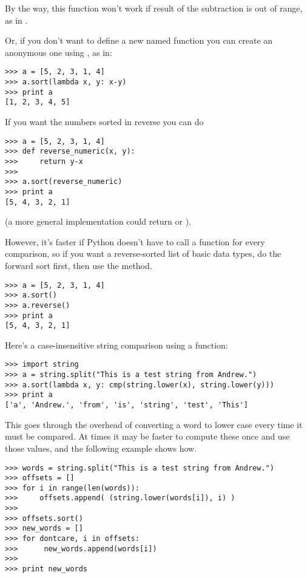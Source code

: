 \documentclass{howto}
\begin{document}
By the way, this function won't work if result of the subtraction
is out of range, as in .

Or, if you don't want to define a new named function you can create an
anonymous one using , as in:

\begin{verbatim}
>>> a = [5, 2, 3, 1, 4]
>>> a.sort(lambda x, y: x-y)
>>> print a
[1, 2, 3, 4, 5]
\end{verbatim}

If you want the numbers sorted in reverse you can do

\begin{verbatim}
>>> a = [5, 2, 3, 1, 4]
>>> def reverse_numeric(x, y):
>>>     return y-x
>>> 
>>> a.sort(reverse_numeric)
>>> print a
[5, 4, 3, 2, 1]
\end{verbatim}

(a more general implementation could return  or ).

However, it's faster if Python doesn't have to call a function for
every comparison, so if you want a reverse-sorted list of basic data
types, do the forward sort first, then use the  method.

\begin{verbatim}
>>> a = [5, 2, 3, 1, 4]
>>> a.sort()
>>> a.reverse()
>>> print a
[5, 4, 3, 2, 1]
\end{verbatim}

Here's a case-insensitive string comparison using a  function:

\begin{verbatim}
>>> import string
>>> a = string.split("This is a test string from Andrew.")
>>> a.sort(lambda x, y: cmp(string.lower(x), string.lower(y)))
>>> print a
['a', 'Andrew.', 'from', 'is', 'string', 'test', 'This']
\end{verbatim}

This goes through the overhead of converting a word to lower case
every time it must be compared.  At times it may be faster to compute
these once and use those values, and the following example shows how.

\begin{verbatim}
>>> words = string.split("This is a test string from Andrew.")
>>> offsets = []
>>> for i in range(len(words)):
>>>     offsets.append( (string.lower(words[i]), i) )
>>> 
>>> offsets.sort()
>>> new_words = []
>>> for dontcare, i in offsets:
>>>      new_words.append(words[i])
>>> 
>>> print new_words
\end{verbatim}
\end{document}
